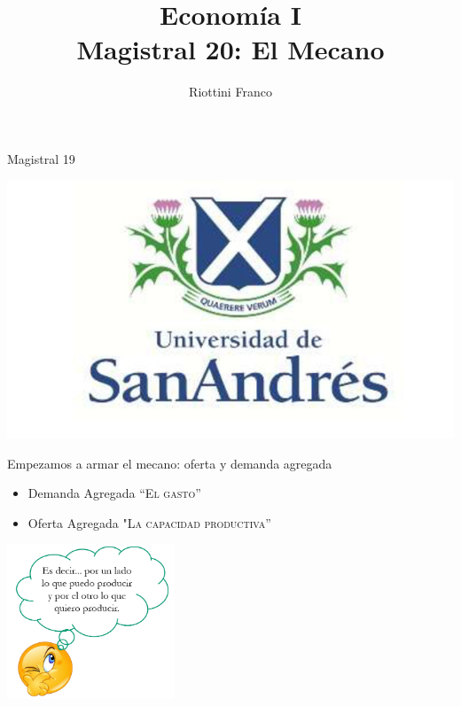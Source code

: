 \documentclass{beamer}
\title[Economía I]{Economía I \vspace{4mm}
\\ Magistral 20: El Mecano}
\date{}
\author[Riottini]{Riottini Franco}
\institute[]{Universidad de San Andrés}
\begin{document}
\begin{frame}
\titlepage
\centering
Magistral 19

\includegraphics[scale=0.2]{../Figures/logoUDESA.jpg} 
\end{frame}


\begin{frame}{Empezamos a armar el mecano: oferta y demanda agregada}

    \begin{itemize}
        \item Demanda Agregada \textsc{“El gasto”} \faCartPlus
        \item Oferta Agregada \textsc{"La capacidad productiva”} \faIndustry
    \end{itemize}
    \vspace{3mm}
    
    \centering\includegraphics[width=5cm]{../Figures/P17b.png}\

\end{frame}
\end{document}
